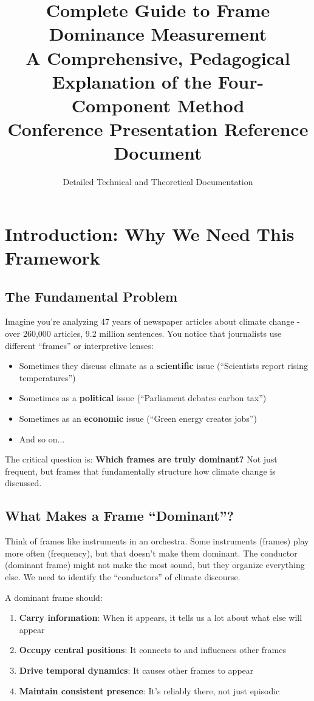 \documentclass[11pt]{article}
\title{\textbf{Complete Guide to Frame Dominance Measurement}\\
\Large A Comprehensive, Pedagogical Explanation of the Four-Component Method\\
\vspace{0.5em}
\large Conference Presentation Reference Document}
\author{Detailed Technical and Theoretical Documentation}
\date{}
\begin{document}
\maketitle
\tableofcontents
\newpage

\section{Introduction: Why We Need This Framework}

\subsection{The Fundamental Problem}

Imagine you're analyzing 47 years of newspaper articles about climate change - over 260,000 articles, 9.2 million sentences. You notice that journalists use different ``frames'' or interpretive lenses:

\begin{itemize}
    \item Sometimes they discuss climate as a \textbf{scientific} issue (``Scientists report rising temperatures'')
    \item Sometimes as a \textbf{political} issue (``Parliament debates carbon tax'')
    \item Sometimes as an \textbf{economic} issue (``Green energy creates jobs'')
    \item And so on...
\end{itemize}

The critical question is: \textbf{Which frames are truly dominant?} Not just frequent, but frames that fundamentally structure how climate change is discussed.

\subsection{What Makes a Frame ``Dominant''?}

Think of frames like instruments in an orchestra. Some instruments (frames) play more often (frequency), but that doesn't make them dominant. The conductor (dominant frame) might not make the most sound, but they organize everything else. We need to identify the ``conductors'' of climate discourse.

A dominant frame should:
\begin{enumerate}
    \item \textbf{Carry information}: When it appears, it tells us a lot about what else will appear
    \item \textbf{Occupy central positions}: It connects to and influences other frames
    \item \textbf{Drive temporal dynamics}: It causes other frames to appear
    \item \textbf{Maintain consistent presence}: It's reliably there, not just episodic
\end{enumerate}
\end{document}
